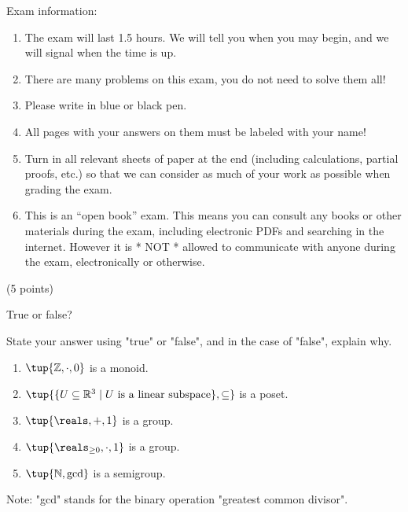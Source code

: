 \documentclass[paper=8.125in:10.250in,pagesize=pdftex,
    headinclude=false,footinclude=false,oneside,egregdoesnotlikesansseriftitles]{kaobook}
\begin{document}
Exam information: 
\begin{enumerate}
\item The exam will last 1.5 hours. We will tell you when you may begin, and we will signal when the time is up. 
\item There are many problems on this exam, you do not need to solve them all! 
\item Please write in blue or black pen. 
\item All pages with your answers on them must be labeled with your name!
\item Turn in all relevant sheets of paper at the end (including calculations, partial proofs, etc.) so that we can consider as much of your work as possible when grading the exam. 
\item This is an ``open book'' exam. This means you can consult any books or other materials during the exam, including electronic PDFs and searching in the internet. However it is * NOT * allowed to communicate with anyone during the exam, electronically or otherwise. 
\end{enumerate}

\newpage



\begin{gradedexercise}\label{ex:AlgebraicGadgets}
(5 points) 
\

True or false? 

State your answer using "true" or "false", and in the case of "false", explain why. 
\begin{enumerate}
\item $\tup{\mathbb{Z}, \cdot, 0}$ is a monoid. 
\item $\tup{\{ U \subseteq \mathbb{R}^3 \mid U \text{ is a linear subspace} \}, \subseteq}$ is a poset. 
\item $\tup{\reals, +, 1}$ is a group.
\item $\tup{\reals_{\geq 0}, \cdot, 1}$ is a group. 
\item $\tup{\mathbb{N}, \text{gcd}}$ is a semigroup.
\end{enumerate}
Note: "gcd" stands for the binary operation "greatest common divisor". 
\end{gradedexercise}


\newpage
\end{document}
